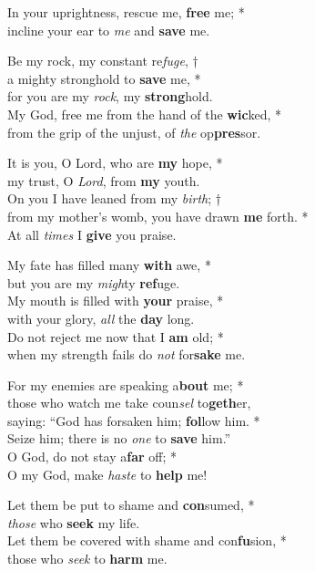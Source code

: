 In your uprightness, rescue me, \textbf{free} me; *\\
incline your ear to \emph{me} and \textbf{save} me. 

Be my rock, my constant re\emph{fuge}, †\\
a mighty stronghold to \textbf{save} me, *\\
for you are my \emph{rock}, my \textbf{strong}hold. \\
My God, free me from the hand of the \textbf{wic}ked, *\\
from the grip of the unjust, of \emph{the} op\textbf{pres}sor. 

It is you, O Lord, who are \textbf{my} hope, *\\
my trust, O \emph{Lord}, from \textbf{my} youth. \\
On you I have leaned from my \emph{birth}; †\\
from my mother's womb, you have drawn \textbf{me} forth. *\\
At all \emph{times} I \textbf{give} you praise. 

My fate has filled many \textbf{with} awe, *\\
but you are my \emph{migh}ty \textbf{ref}uge. \\
My mouth is filled with \textbf{your} praise, *\\
with your glory, \emph{all} the \textbf{day} long. \\
Do not reject me now that I \textbf{am} old; *\\
when my strength fails do \emph{not} for\textbf{sake} me. 

For my enemies are speaking a\textbf{bout} me; *\\
those who watch me take coun\emph{sel} to\textbf{geth}er, \\
saying: ``God has forsaken him; \textbf{fol}low him. *\\ 
Seize him; there is no \emph{one} to \textbf{save} him.'' \\
O God, do not stay a\textbf{far} off; *\\
O my God, make \emph{haste} to \textbf{help} me! 

Let them be put to shame and \textbf{con}sumed, *\\
\emph{those} who \textbf{seek} my life. \\
Let them be covered with shame and con\textbf{fu}sion, *\\
those who \emph{seek} to \textbf{harm} me. 

